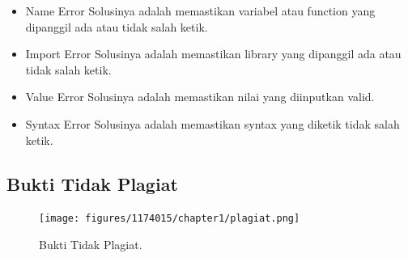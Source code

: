 \begin{enumerate}
	\begin{itemize}
		\item Name Error
		\hfill\break
		Solusinya adalah memastikan variabel atau function yang dipanggil ada atau tidak salah ketik.
		\item Import Error
		\hfill\break
		Solusinya adalah memastikan library yang dipanggil ada atau tidak salah ketik.
		\item Value Error
		\hfill\break
		Solusinya adalah memastikan nilai yang diinputkan valid.
		\item Syntax Error
		\hfill\break
		Solusinya adalah memastikan syntax yang diketik tidak salah ketik.
	\end{itemize}
\end{enumerate}

\subsection{Bukti Tidak Plagiat}
\begin{figure}[H]
	\texttt{[image: figures/1174015/chapter1/plagiat.png]}
	\centering
	\caption{Bukti Tidak Plagiat.}
\end{figure}